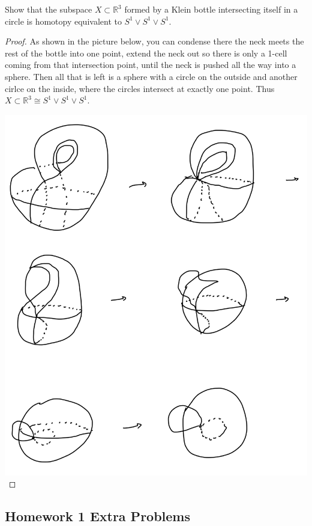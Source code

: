 \documentclass[12pt]{article}
\newenvironment{statement}[2][Statement]{\begin{trivlist}
\item[\hskip \labelsep {\bfseries #1}\hskip \labelsep {\bfseries #2.}]}{\end{trivlist}}
\begin{document}
\begin{statement}[Exercise]{0.20}
    Show that the subspace $X \subset \mathbb{R}^3$ formed by a Klein bottle intersecting itself in a circle is homotopy equivalent to $S^1 \vee S^1 \vee S^1$.
\end{statement}
\begin{proof}
    As shown in the picture below, you can condense there the neck meets the rest of the bottle into one point, extend the neck out so there is only a 1-cell coming from that intersection point, until the neck is pushed all the way into a sphere. Then all that is left is a sphere with a circle on the outside and another cirlce on the inside, where the circles intersect at exactly one point. Thus $X \subset \mathbb{R}^3 \cong S^1 \vee S^1 \vee S^1$.
    \par \includegraphics[scale=.3]{1.20.jpg}
\end{proof}

\subsection{Homework 1 Extra Problems}
\end{document}
